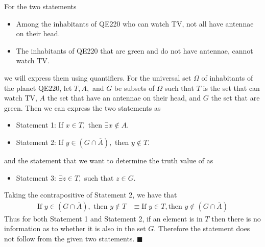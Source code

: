 \documentclass[11pt, oneside]{article}   	%
\newcommand*{\QEDA}{\hfill\ensuremath{\blacksquare}}         %
\begin{document}
For the two statements
\begin{itemize}
	\item Among the inhabitants of QE220 who can watch TV, not all have antennae on their head.
	\item The inhabitants of QE220 that are green and do not have antennae, cannot watch TV.
\end{itemize}

we will express them using quantifiers. For the universal set $\Omega$ of inhabitants of the planet QE220, let $T, A,$ and $G$ be subsets of $\Omega$ such that $T$ is the set that can watch TV, $A$ the set that have an antennae on their head, and $G$ the set that are green. Then we can express the two statements as

\begin{itemize}
	\item Statement 1: If $x \in T,$ then $\exists x \notin A$.
	\item Statement 2: If $y \in (G \cap \overline{A}),$ then $y \notin T$.
\end{itemize}

and the statement  that we want to determine the truth value of as
\begin{itemize}
	\item Statement 3: $\exists z \in T,$ such that $z \in G$.
\end{itemize}

Taking the contrapositive of Statement 2, we have that
\begin{align*}
	\text{If } y \in (G \cap \overline{A}), \text{ then } y \notin T & \equiv \text{If } y \in T, \text{then } y \notin (G \cap \overline{A})
\end{align*}
Thus for both Statement 1 and Statement 2, if an element is in $T$ then there is no information as to whether it is also in the set $G$. Therefore the statement  does not follow from the given two statements. \QEDA
\end{document}
